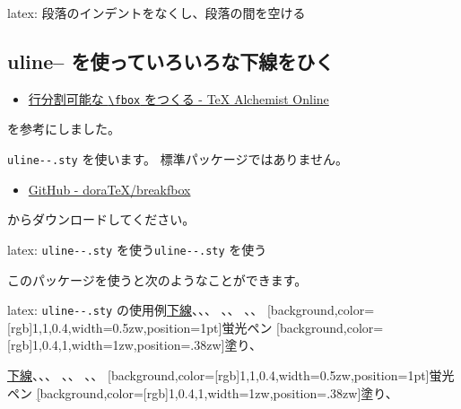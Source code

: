 \documentclass[dvipdfmx,a4j,14pt,uplatex,openany]{jsbook}
\begin{document}
\begin{programlist}[label={orgced3eb7}]{latex}{: 段落のインデントをなくし、段落の間を空ける}%
\usepackage[skip=1.2em]{parskip}
\end{programlist}

\subsection{uline-- を使っていろいろな下線をひく}
\label{sec:orgf79fd95}

\begin{itemize}
\item \href{http://doratex.hatenablog.jp/entry/20171219/1513609345}{行分割可能な \texttt{\textbackslash{}fbox} をつくる - \TeX{} Alchemist Online}
\end{itemize}

を参考にしました。

\texttt{uline-{}-.sty} を使います。
標準パッケージではありません。

\begin{itemize}
\item \href{https://github.com/doraTeX/breakfbox}{GitHub - doraTeX/breakfbox}
\end{itemize}

からダウンロードしてください。

\begin{programlist}[label={orgb7c9f45}]{latex}{: \texttt{uline-{}-.sty} を使う\texttt{uline-{}-.sty} を使う}\usepackage[usetype1]{uline--}
\end{programlist}

このパッケージを使うと次のようなことができます。

\begin{programlist}[label={orgda4a9c6}]{latex}{: \texttt{uline-{}-.sty} の使用例}\uline{下線}、、、
、、
、、
\uline[background,color={[rgb]{1,1,0.4}},width=0.5zw,position=1pt]{蛍光ペン}
\uline[background,color={[rgb]{1,0.4,1}},width=1zw,position=.38zw]{塗り}、
\end{programlist}

\uline{下線}、、、
、、
、、
\uline[background,color={[rgb]{1,1,0.4}},width=0.5zw,position=1pt]{蛍光ペン}
\uline[background,color={[rgb]{1,0.4,1}},width=1zw,position=.38zw]{塗り}、
\end{document}
